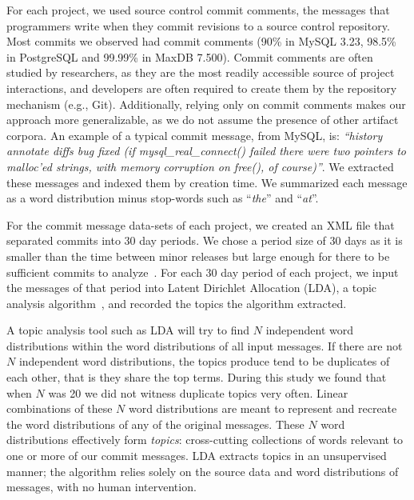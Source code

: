 \documentclass[smallextended]{svjour3}       %
\begin{document}
For each project, we used source control commit comments, the messages
that programmers write when they commit revisions to a source control
repository. 
Most commits we observed had commit comments (90\% in MySQL 3.23,
98.5\% in PostgreSQL and 99.99\% in MaxDB 7.500).
Commit comments are often studied by researchers, as they are the most readily accessible source of project interactions, and developers are often
required to create them by the repository mechanism (e.g., Git).  Additionally, relying only on commit comments makes our approach more generalizable,
as we do not assume the presence of other artifact corpora.
An example of a typical commit message, from MySQL, is: \textit{``history annotate diffs bug fixed (if mysql\-\_real\-\_connect() failed there were
two pointers to malloc'ed strings, with memory corruption on free(), of course)''}. 
We extracted these messages and indexed them by creation time. 
We summarized each message as a word distribution minus stop-words such as ``\emph{the}'' and ``\emph{at}''. 

For the commit message data-sets of each project, we created an XML file that separated commits into 30 day periods. 
We chose a period size of 30 days as it is smaller than the time between minor releases but large enough for there to be sufficient commits to
analyze~\cite{Hindle09ICSM}. 
For each 30 day period of each project, we input the messages of that period into Latent Dirichlet Allocation (LDA), a topic analysis
algorithm~\cite{Blei2003}, and recorded the topics the algorithm extracted.

A topic analysis tool such as LDA will try to find $N$ independent
word distributions within the word distributions of all input
messages. 
If there are not $N$ independent word distributions, the topics
produce tend to be duplicates of each other, that is they share the
top terms. During this study we found that when $N$ was 20 we did not
witness duplicate topics very often.
Linear combinations of these $N$ word distributions are meant to represent and recreate the word distributions of any of the original messages. 
These $N$ word distributions effectively form \emph{topics}: cross-cutting collections of words relevant to one or more of our commit messages. 
LDA extracts topics in an unsupervised manner; the algorithm relies
solely on the source data and word distributions of messages, with no human intervention.
\end{document}

